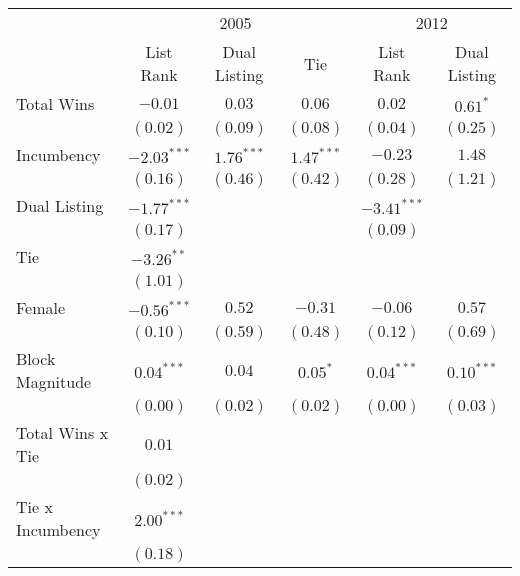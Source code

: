 
\begin{table}
\begin{center}
\begin{tabular}{l c c c c c}
\hline
 & \multicolumn{3}{c}{2005} & \multicolumn{2}{c}{2012} \\
\cline{2-4} \cline{5-6}
 & List Rank & Dual Listing & Tie & List Rank & Dual Listing \\
\hline
Total Wins         & $-0.01$       & $0.03$       & $0.06$       & $0.02$        & $0.61^{*}$   \\
                   & $(0.02)$      & $(0.09)$     & $(0.08)$     & $(0.04)$      & $(0.25)$     \\
Incumbency         & $-2.03^{***}$ & $1.76^{***}$ & $1.47^{***}$ & $-0.23$       & $1.48$       \\
                   & $(0.16)$      & $(0.46)$     & $(0.42)$     & $(0.28)$      & $(1.21)$     \\
Dual Listing       & $-1.77^{***}$ &              &              & $-3.41^{***}$ &              \\
                   & $(0.17)$      &              &              & $(0.09)$      &              \\
Tie                & $-3.26^{**}$  &              &              &               &              \\
                   & $(1.01)$      &              &              &               &              \\
Female             & $-0.56^{***}$ & $0.52$       & $-0.31$      & $-0.06$       & $0.57$       \\
                   & $(0.10)$      & $(0.59)$     & $(0.48)$     & $(0.12)$      & $(0.69)$     \\
Block Magnitude    & $0.04^{***}$  & $0.04$       & $0.05^{*}$   & $0.04^{***}$  & $0.10^{***}$ \\
                   & $(0.00)$      & $(0.02)$     & $(0.02)$     & $(0.00)$      & $(0.03)$     \\
Total Wins x Tie   & $0.01$        &              &              &               &              \\
                   & $(0.02)$      &              &              &               &              \\
Tie x Incumbency   & $2.00^{***}$  &              &              &               &              \\
                   & $(0.18)$      &              &              &               &              \\

\end{tabular}
\end{center}
\end{table}

